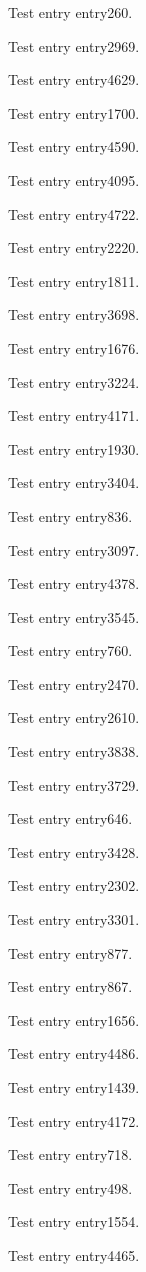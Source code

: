 Test entry \gls{entry260}.

Test entry \gls{entry2969}.

Test entry \gls{entry4629}.

Test entry \gls{entry1700}.

Test entry \gls{entry4590}.

Test entry \gls{entry4095}.

Test entry \gls{entry4722}.

Test entry \gls{entry2220}.

Test entry \gls{entry1811}.

Test entry \gls{entry3698}.

Test entry \gls{entry1676}.

Test entry \gls{entry3224}.

Test entry \gls{entry4171}.

Test entry \gls{entry1930}.

Test entry \gls{entry3404}.

Test entry \gls{entry836}.

Test entry \gls{entry3097}.

Test entry \gls{entry4378}.

Test entry \gls{entry3545}.

Test entry \gls{entry760}.

Test entry \gls{entry2470}.

Test entry \gls{entry2610}.

Test entry \gls{entry3838}.

Test entry \gls{entry3729}.

Test entry \gls{entry646}.

Test entry \gls{entry3428}.

Test entry \gls{entry2302}.

Test entry \gls{entry3301}.

Test entry \gls{entry877}.

Test entry \gls{entry867}.

Test entry \gls{entry1656}.

Test entry \gls{entry4486}.

Test entry \gls{entry1439}.

Test entry \gls{entry4172}.

Test entry \gls{entry718}.

Test entry \gls{entry498}.

Test entry \gls{entry1554}.

Test entry \gls{entry4465}.

